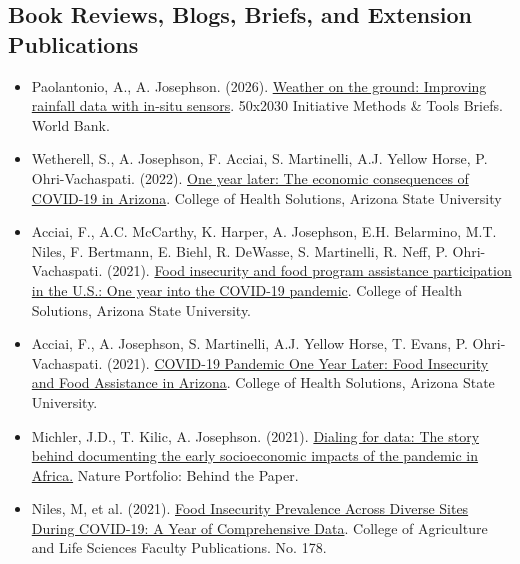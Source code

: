 \documentclass[letterpaper]{article}
\begin{document}
\subsection*{Book Reviews, Blogs, Briefs, and Extension Publications}

\begin{itemize} 

\item Paolantonio, A., A. Josephson. (2026). \href{https://www.50x2030.org/sites/default/files/resources/documents/2026-09/Weather%20on%20the%20Ground.%20Improving%20Rainfall%20Data%20with%20In-Situ%20Sensors.pdf}{Weather on the ground: Improving rainfall data with in-situ sensors}. 50x2030 Initiative Methods \& Tools Briefs. World Bank.

\item Wetherell, S., A. Josephson, F. Acciai, S. Martinelli, A.J. Yellow Horse, P. Ohri-Vachaspati. (2022). \href{https://keep.lib.asu.edu/items/167721}{One year later: The economic consequences of COVID-19 in Arizona}. College of Health Solutions, Arizona State University

\item Acciai, F., A.C. McCarthy, K. Harper, A. Josephson, E.H. Belarmino, M.T. Niles, F. Bertmann, E. Biehl, R. DeWasse, S. Martinelli, R. Neff, P. Ohri-Vachaspati. (2021). \href{https://keep.lib.asu.edu/items/160694}{Food insecurity and food program assistance participation in the U.S.: One year into the COVID-19 pandemic}. College of Health Solutions, Arizona State University. 
	
\item Acciai, F., A. Josephson, S. Martinelli, A.J. Yellow Horse, T. Evans, P. Ohri-Vachaspati. (2021). \href{https://keep.lib.asu.edu/items/160095}{COVID-19 Pandemic One Year Later: Food Insecurity and Food Assistance in Arizona}. College of Health Solutions, Arizona State University. 
	
\item Michler, J.D., T. Kilic, A. Josephson. (2021). \href{https://go.nature.com/31Hp0SM}{Dialing for data: The story behind documenting the early socioeconomic impacts of the pandemic in Africa.} Nature Portfolio: Behind the Paper.
	
\item Niles, M, et al. (2021). \href{https://scholarworks.uvm.edu/calsfac/178/}{Food Insecurity Prevalence Across Diverse Sites During COVID-19: A Year of Comprehensive Data}. College of Agriculture and Life Sciences Faculty Publications. No. 178. 


\end{itemize}
\end{document}
